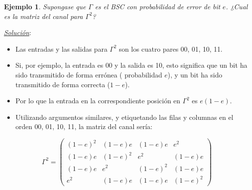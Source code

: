 \documentclass{beamer}
\theoremstyle{plain}
\theoremstyle{example}
\theoremstyle{example}
\newtheorem{ejemplo} [Ejemplo] {Ejemplo}
\begin{document}
\begin{frame}  \footnotesize

\begin{ejemplo}
Supongase que $\Gamma$ es el BSC con probabilidad de error de bit $e$. ¿Cual es la matriz del canal para $\Gamma^2$?
\end{ejemplo}

\textit{\underline{Solución}}:\\

\begin{itemize} 

\item
Las entradas y las salidas para $\Gamma^2$ son los cuatro pares 00, 01, 10, 11. 

\item
Si, por ejemplo, la entrada es 00 y la salida es 10, esto significa que un bit ha sido transmitido de forma errónea ( probabilidad $e$), y un bit ha sido transmitido de forma correcta ($1-e$). 

\item
Por lo que la entrada en la correspondiente posición en $\Gamma^2$ es $e (1-e)$. 

\item 

Utilizando argumentos similares, y etiquetando las filas y columnas en el orden 00, 01, 10, 11, la matriz del canal sería:
\end{itemize} 
\[
\Gamma^2 = \left( \begin{array}{ccccc}
                   
                (1-e)^2  & (1-e) e  & (1-e) e  & e^2 \\
                 (1-e) e  & (1-e)^2 & e^2       &  (1-e) e \\
                 (1-e) e  &  e^2      & (1-e)^2 & (1-e) e \\
                 e^2       & (1-e) e  & (1-e) e  & (1-e)^2  
           \end{array}
    \right) 
\]

\end{frame} 
\end{document}

